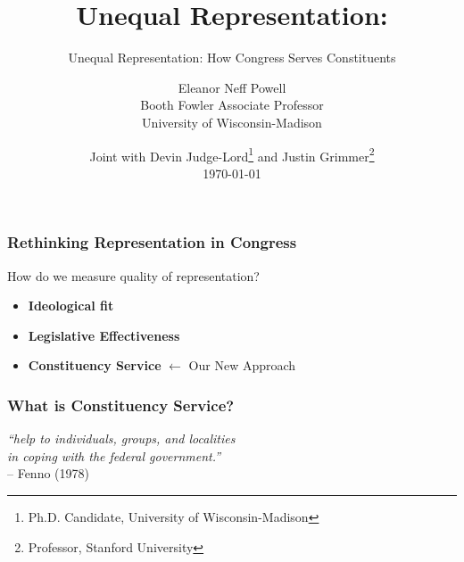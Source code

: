 \documentclass[13pt]{beamer}
\title{Unequal Representation:}
\subtitle{Unequal Representation: How Congress Serves Constituents}
\author[Judge-Lord, Grimmer, Powell]{Eleanor Neff Powell \\ Booth Fowler Associate Professor \\ University of Wisconsin-Madison}
\date[\today]{Joint with Devin Judge-Lord\thanks{Ph.D. Candidate, University of Wisconsin-Madison} and Justin Grimmer\thanks{Professor, Stanford University} \\ \bigskip \today}
\begin{document}
\begin{frame}
\maketitle
\end{frame}






\begin{frame} 
\frametitle{Rethinking Representation in Congress}
\Large
How do we measure quality of representation?

\begin{itemize}
\item \textbf{Ideological fit}
\item \textbf{Legislative Effectiveness}
\item \textbf{Constituency Service} \alert{$\leftarrow$ Our New Approach}
\end{itemize}
\end{frame}
\begin{frame}
\frametitle{What is Constituency Service?}
\begin{center}
\Large
\textit{``help to individuals, groups, and localities \\ in coping with the federal government.''}\\  -- Fenno (1978)
\end{center}
\end{frame}
\end{document}
